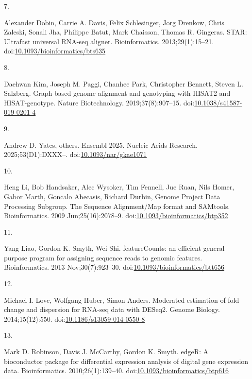 \documentclass[
  12pt,
  letterpaper,
  DIV=11,
  numbers=noendperiod]{scrartcl}
\newlength{\cslhangindent}
\newlength{\csllabelwidth}
\newenvironment{CSLReferences}[2] %
 {\begin{list}{}{%
  \setlength{\itemindent}{0pt}
  \setlength{\leftmargin}{0pt}
  \setlength{\parsep}{0pt}
  \ifodd #1
   \setlength{\leftmargin}{\cslhangindent}
   \setlength{\itemindent}{-1\cslhangindent}
  \fi
  \setlength{\itemsep}{#2\baselineskip}}}
 {\end{list}}
\newcommand{\CSLLeftMargin}[1]{\parbox[t]{\csllabelwidth}{\strut#1\strut}}
\newcommand{\CSLRightInline}[1]{\parbox[t]{\linewidth - \csllabelwidth}{\strut#1\strut}}
\begin{document}
\begin{CSLReferences}{0}{1}
\CSLLeftMargin{7. }%
\CSLRightInline{Alexander Dobin, Carrie A. Davis, Felix Schlesinger,
Jorg Drenkow, Chris Zaleski, Sonali Jha, Philippe Batut, Mark Chaisson,
Thomas R. Gingeras. STAR: Ultrafast universal RNA-seq aligner.
Bioinformatics. 2013;29(1):15--21.
doi:\href{https://doi.org/10.1093/bioinformatics/bts635}{10.1093/bioinformatics/bts635}}

\CSLLeftMargin{8. }%
\CSLRightInline{Daehwan Kim, Joseph M. Paggi, Chanhee Park, Christopher
Bennett, Steven L. Salzberg. Graph-based genome alignment and genotyping
with HISAT2 and HISAT-genotype. Nature Biotechnology.
2019;37(8):907--15.
doi:\href{https://doi.org/10.1038/s41587-019-0201-4}{10.1038/s41587-019-0201-4}}

\CSLLeftMargin{9. }%
\CSLRightInline{Andrew D. Yates, others. Ensembl 2025. Nucleic Acids
Research. 2025;53(D1):DXXX--.
doi:\href{https://doi.org/10.1093/nar/gkae1071}{10.1093/nar/gkae1071}}

\CSLLeftMargin{10. }%
\CSLRightInline{Heng Li, Bob Handsaker, Alec Wysoker, Tim Fennell, Jue
Ruan, Nils Homer, Gabor Marth, Goncalo Abecasis, Richard Durbin, Genome
Project Data Processing Subgroup. {The Sequence Alignment/Map format and
SAMtools}. Bioinformatics. 2009 Jun;25(16):2078--9.
doi:\href{https://doi.org/10.1093/bioinformatics/btp352}{10.1093/bioinformatics/btp352}}

\CSLLeftMargin{11. }%
\CSLRightInline{Yang Liao, Gordon K. Smyth, Wei Shi. {featureCounts: an
efficient general purpose program for assigning sequence reads to
genomic features}. Bioinformatics. 2013 Nov;30(7):923--30.
doi:\href{https://doi.org/10.1093/bioinformatics/btt656}{10.1093/bioinformatics/btt656}}

\CSLLeftMargin{12. }%
\CSLRightInline{Michael I. Love, Wolfgang Huber, Simon Anders. Moderated
estimation of fold change and dispersion for RNA-seq data with DESeq2.
Genome Biology. 2014;15(12):550.
doi:\href{https://doi.org/10.1186/s13059-014-0550-8}{10.1186/s13059-014-0550-8}}

\CSLLeftMargin{13. }%
\CSLRightInline{Mark D. Robinson, Davis J. McCarthy, Gordon K. Smyth.
edgeR: A bioconductor package for differential expression analysis of
digital gene expression data. Bioinformatics. 2010;26(1):139--40.
doi:\href{https://doi.org/10.1093/bioinformatics/btp616}{10.1093/bioinformatics/btp616}}


\end{CSLReferences}
\end{document}

